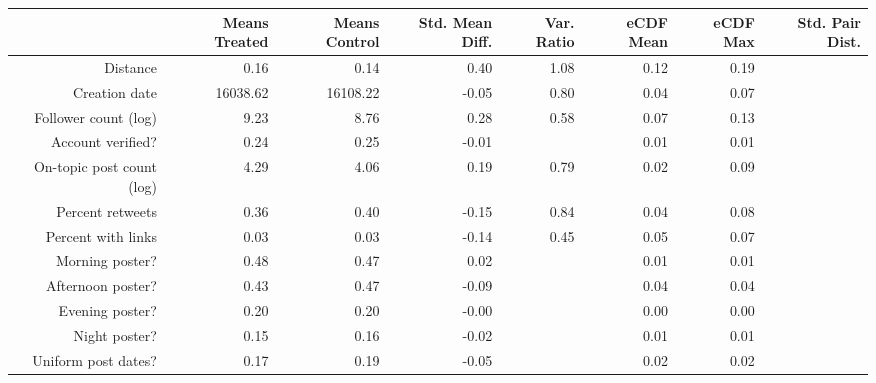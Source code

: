 \begin{table}[ht]
\centering
\begin{tabular}{rrrrrrrr}
  & Means Treated & Means Control & Std. Mean Diff. & Var. Ratio & eCDF Mean & eCDF Max & Std. Pair Dist. \\ 
  \hline
Distance & 0.16 & 0.14 & 0.40 & 1.08 & 0.12 & 0.19 &  \\ 
   \hline
Creation date & 16038.62 & 16108.22 & -0.05 & 0.80 & 0.04 & 0.07 &  \\ 
   \hline
Follower count (log) & 9.23 & 8.76 & 0.28 & 0.58 & 0.07 & 0.13 &  \\ 
   \hline
Account verified? & 0.24 & 0.25 & -0.01 &  & 0.01 & 0.01 &  \\ 
   \hline
On-topic post count (log) & 4.29 & 4.06 & 0.19 & 0.79 & 0.02 & 0.09 &  \\ 
   \hline
Percent retweets & 0.36 & 0.40 & -0.15 & 0.84 & 0.04 & 0.08 &  \\ 
   \hline
Percent with links & 0.03 & 0.03 & -0.14 & 0.45 & 0.05 & 0.07 &  \\ 
   \hline
Morning poster? & 0.48 & 0.47 & 0.02 &  & 0.01 & 0.01 &  \\ 
   \hline
Afternoon poster? & 0.43 & 0.47 & -0.09 &  & 0.04 & 0.04 &  \\ 
   \hline
Evening poster? & 0.20 & 0.20 & -0.00 &  & 0.00 & 0.00 &  \\ 
   \hline
Night poster? & 0.15 & 0.16 & -0.02 &  & 0.01 & 0.01 &  \\ 
   \hline
Uniform post dates? & 0.17 & 0.19 & -0.05 &  & 0.02 & 0.02 &  \\ 
   \hline
\end{tabular}
\end{table}
